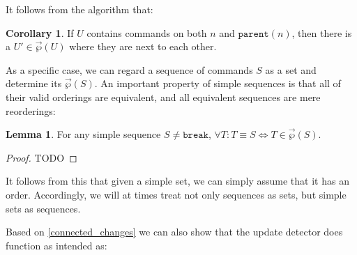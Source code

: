 \documentclass[12pt]{article}
\newcommand{\parent}{\mathtt{parent}}
\newcommand{\cbrk}{\mathtt{break}} %
\newcommand{\orderset}[1]{\vec{\wp}({#1})}
\theoremstyle{definition}
\newtheorem{mylem}{Lemma}
\newtheorem{mycor}{Corollary}
\begin{document}
It follows from the algorithm that:
\begin{mycor}\label{lemma:neighbor}
If $U$ contains commands on both $n$ and $\parent(n)$, then
there is a $U'\in\orderset{U}$ where they are next to each other.
\end{mycor}

As a specific case, we can regard a sequence of commands $S$
as a set and determine its $\orderset{S}$.
An important property of simple sequences is that
all of their valid orderings are equivalent,
and all equivalent sequences are mere reorderings:

\begin{mylem}\label{simple_reorder_equiv}
For any simple sequence $S\neq\cbrk$,
$\forall T: T\equiv S \Leftrightarrow T\in\orderset{S}$.
\end{mylem}
\begin{proof}
TODO
\end{proof}

It follows from this that given a simple set,
we can simply assume that it has an order.
Accordingly, we will at times treat not only sequences as sets,
but simple sets as sequences.


\medskip


Based on \cref{connected_changes} we can also show that
the update detector does function as intended as:
\end{document}
